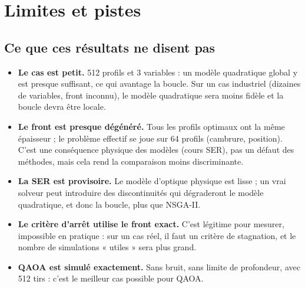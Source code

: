 \chapter{Limites et pistes}\label{ch:pistes}

\section{Ce que ces résultats ne disent pas}
\begin{itemize}
\item \textbf{Le cas est petit.} 512 profils et 3 variables : un modèle quadratique global y est presque suffisant, ce qui avantage la boucle. Sur un cas industriel (dizaines de variables, front inconnu), le modèle quadratique sera moins fidèle et la boucle devra être locale.
\item \textbf{Le front est presque dégénéré.} Tous les profils optimaux ont la même épaisseur ; le problème effectif se joue sur 64 profils (cambrure, position). C'est une conséquence physique des modèles (cours SER), pas un défaut des méthodes, mais cela rend la comparaison moins discriminante.
\item \textbf{La SER est provisoire.} Le modèle d'optique physique est lisse ; un vrai solveur peut introduire des discontinuités qui dégraderont le modèle quadratique, et donc la boucle, plus que NSGA-II.
\item \textbf{Le critère d'arrêt utilise le front exact.} C'est légitime pour mesurer, impossible en pratique : sur un cas réel, il faut un critère de stagnation, et le nombre de simulations « utiles » sera plus grand.
\item \textbf{QAOA est simulé exactement.} Sans bruit, sans limite de profondeur, avec 512 tirs : c'est le meilleur cas possible pour QAOA.
\end{itemize}

